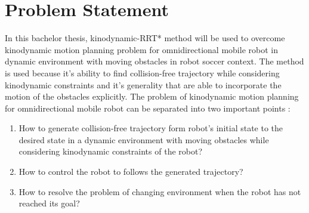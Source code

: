 \documentclass[../thesis.tex]{subfiles}
\begin{document}

\section{Problem Statement}

In this bachelor thesis, kinodynamic-RRT* method will be used to overcome kinodynamic motion planning problem for omnidirectional mobile robot in dynamic environment with moving obstacles in robot soccer context. The method is used because it's ability to find collision-free trajectory while considering kinodynamic constraints and it's generality that are able to incorporate the motion of the obstacles explicitly. The problem of kinodynamic motion planning for omnidirectional mobile robot can be separated into two important points :

\begin{enumerate}
\item How to generate collision-free trajectory form robot's initial state to the desired state in a dynamic environment with moving obstacles while considering kinodynamic constraints of the robot?
\item How to control the robot to follows the generated trajectory?
\item How to resolve the problem of changing environment when the robot has not reached its goal?
\end{enumerate}
\end{document}
